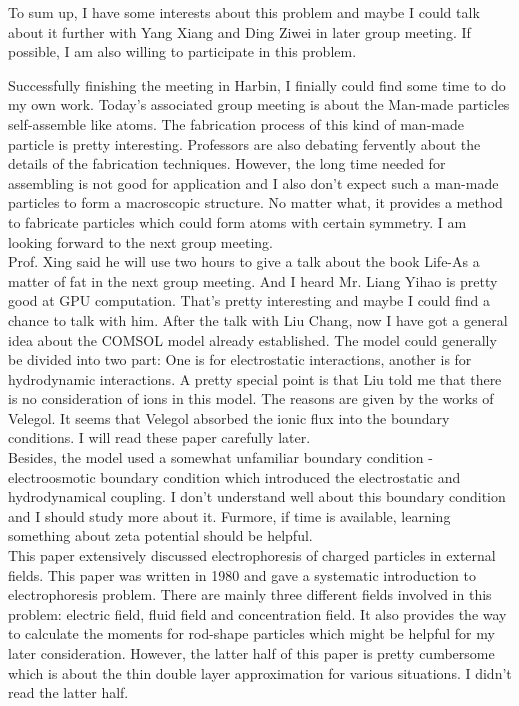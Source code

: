 \documentclass[fontsize=11pt, %
                             paper=a4, %
                             twoside, %
                             captions=tableheading,
                             index=totoc,
                             hyperref]{labbook}
\begin{document}
\begin{addmargin}[4cm]{0cm}
To sum up, I have some interests about this problem and maybe I could talk about it further with Yang Xiang and Ding Ziwei in later group meeting. If possible, I am also willing to participate in this problem.

Successfully finishing the meeting in Harbin, I finially could find some time to do my own work. Today's associated group meeting is about the Man-made particles self-assemble like atoms. The fabrication process of this kind of man-made particle is pretty interesting. Professors are also debating fervently about the details of the fabrication techniques. However, the long time needed for assembling is not good for application and I also don't expect such a man-made particles to form a macroscopic structure. No matter what, it provides a method to fabricate particles which could form atoms with certain symmetry. I am looking forward to the next group meeting. \\
Prof. Xing said he will use two hours to give a talk about the book Life-As a matter of fat in the next group meeting. And I heard Mr. Liang Yihao is pretty good at GPU computation. That's pretty interesting and maybe I could find a chance to talk with him. 
After the talk with Liu Chang, now I have got a general idea about the COMSOL model already established. The model could generally be divided into two part: One is for electrostatic interactions, another is for hydrodynamic interactions. A pretty special point is that Liu told me that there is no consideration of ions in this model. The reasons are given by the works of Velegol\cite{Kline2006,ChiangVelegol2014}. It seems that Velegol absorbed the ionic flux into the boundary conditions. I will read these paper carefully later.\\
Besides, the model used a somewhat unfamiliar boundary condition - electroosmotic boundary condition which introduced the electrostatic and hydrodynamical coupling. I don't understand well about this boundary condition and I should study more about it. Furmore, if time is available, learning something about zeta potential should be helpful.\\
This paper extensively discussed electrophoresis of charged particles in external fields. This paper was written in 1980 and gave a systematic introduction to electrophoresis problem. There are mainly three different fields involved in this problem: electric field, fluid field and concentration field. It also provides the way to calculate the moments for rod-shape particles \cite{Fixman1980a} which might be helpful for my later consideration. However, the latter half of this paper is pretty cumbersome which is about the thin double layer approximation for various situations. I didn't read the latter half.

\end{addmargin}
\end{document}
